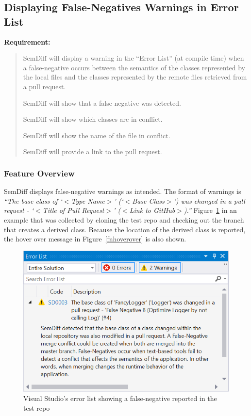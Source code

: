 \documentclass[draftclsnofoot,onecolumn]{IEEEtran}
\begin{document}
\subsection{Displaying False-Negatives Warnings in Error List}%

\textbf{Requirement:}

\begin{quote}

SemDiff will display a warning in the ``Error List'' (at compile time) when a false-negative occurs between the semantics of the classes represented by the local files and the classes represented by the remote files retrieved from a pull request.

SemDiff will show that a false-negative was detected.

SemDiff will show which classes are in conflict.

SemDiff will show the name of the file in conflict.

SemDiff will provide a link to the pull request.

\end{quote}

\subsubsection{Feature Overview}

SemDiff displays false-negative warnings as intended. The format of warnings is \textit{``The base class of `$<$Type Name$>$' (`$<$Base Class$>$') was changed in a pull request - `$<$Title of Pull Request$>$' ($<$Link to GitHub$>$).''}  Figure~\ref{fnerrorlist} in an example that was collected by cloning the test repo and checking out the branch that creates a derived class. Because the location of the derived class is reported, the hover over message in Figure~\ref{fnhoverover} is also shown.

\begin{figure}[htb]
\centering
\includegraphics[scale=1]{FalseNegativeErrorList}
\caption{Visual Studio's error list showing a false-negative reported in 
the test repo}
\label{fnerrorlist}
\end{figure}
\end{document}
